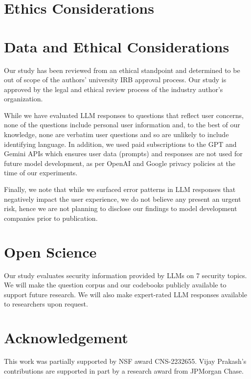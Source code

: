 \if {}
\section{Ethics Considerations}
\label{sec:compliance}
\else
\section{Data and Ethical Considerations}
\fi

Our study has been reviewed from an ethical standpoint and determined to be out of scope of the authors' university IRB approval process.
Our study is approved by the legal and ethical review process  of the industry author's organization.

While we have evaluated LLM responses to questions that reflect user concerns, none of the questions include personal user information and, to the best of our knowledge, none are verbatim user questions and so are unlikely to include identifying language. In addition, we used paid subscriptions to the GPT and Gemini APIs which ensures user data (prompts) and responses are not used for future model development, as per OpenAI and Google privacy policies at the time of our experiments.


Finally, we note that while we surfaced error patterns in LLM responses that negatively impact the user experience, we do not believe any present an urgent risk, hence we are not planning to disclose our findings to model development companies prior to publication. 




\if {}
\section{Open Science}
\label{sec:open-science}
Our study evaluates security information provided by LLMs on 7 security topics. We will make the question corpus and our codebooks publicly available to support future research. We will also make expert-rated LLM responses available to researchers upon request. 
\fi

\section*{Acknowledgement}
\noindent This work was partially supported by NSF award CNS-2232655. Vijay Prakash's contributions are supported in part by a research award from JPMorgan Chase.

